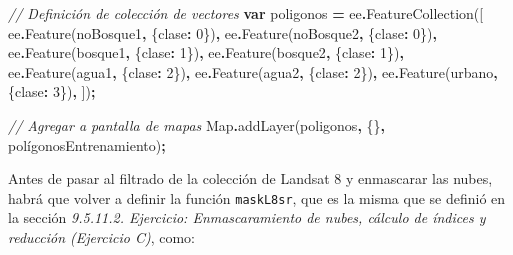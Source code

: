 \documentclass[
  12pt,
  letterpaper,
  twoside]{book}
\newenvironment{Shaded}{\begin{snugshade}}{\end{snugshade}}
\newcommand{\BuiltInTok}[1]{#1}
\newcommand{\CommentTok}[1]{\textcolor[rgb]{0.56,0.35,0.01}{\textit{#1}}}
\newcommand{\DecValTok}[1]{\textcolor[rgb]{0.00,0.00,0.81}{#1}}
\newcommand{\FunctionTok}[1]{\textcolor[rgb]{0.00,0.00,0.00}{#1}}
\newcommand{\KeywordTok}[1]{\textcolor[rgb]{0.13,0.29,0.53}{\textbf{#1}}}
\newcommand{\NormalTok}[1]{#1}
\newcommand{\OperatorTok}[1]{\textcolor[rgb]{0.81,0.36,0.00}{\textbf{#1}}}
\newcommand{\StringTok}[1]{\textcolor[rgb]{0.31,0.60,0.02}{#1}}
\begin{document}
\begin{Shaded}
\begin{Highlighting}[]
\CommentTok{// Definición de colección de vectores}
\KeywordTok{var}\NormalTok{ poligonos }\OperatorTok{=}\NormalTok{ ee}\OperatorTok{.}\FunctionTok{FeatureCollection}\NormalTok{([}
\NormalTok{  ee}\OperatorTok{.}\FunctionTok{Feature}\NormalTok{(noBosque1}\OperatorTok{,}\NormalTok{ \{}\StringTok{\textquotesingle{}clase\textquotesingle{}}\OperatorTok{:} \DecValTok{0}\NormalTok{\})}\OperatorTok{,}
\NormalTok{  ee}\OperatorTok{.}\FunctionTok{Feature}\NormalTok{(noBosque2}\OperatorTok{,}\NormalTok{ \{}\StringTok{\textquotesingle{}clase\textquotesingle{}}\OperatorTok{:} \DecValTok{0}\NormalTok{\})}\OperatorTok{,}
\NormalTok{  ee}\OperatorTok{.}\FunctionTok{Feature}\NormalTok{(bosque1}\OperatorTok{,}\NormalTok{ \{}\StringTok{\textquotesingle{}clase\textquotesingle{}}\OperatorTok{:} \DecValTok{1}\NormalTok{\})}\OperatorTok{,}
\NormalTok{  ee}\OperatorTok{.}\FunctionTok{Feature}\NormalTok{(bosque2}\OperatorTok{,}\NormalTok{ \{}\StringTok{\textquotesingle{}clase\textquotesingle{}}\OperatorTok{:} \DecValTok{1}\NormalTok{\})}\OperatorTok{,}
\NormalTok{  ee}\OperatorTok{.}\FunctionTok{Feature}\NormalTok{(agua1}\OperatorTok{,}\NormalTok{ \{}\StringTok{\textquotesingle{}clase\textquotesingle{}}\OperatorTok{:} \DecValTok{2}\NormalTok{\})}\OperatorTok{,}
\NormalTok{  ee}\OperatorTok{.}\FunctionTok{Feature}\NormalTok{(agua2}\OperatorTok{,}\NormalTok{ \{}\StringTok{\textquotesingle{}clase\textquotesingle{}}\OperatorTok{:} \DecValTok{2}\NormalTok{\})}\OperatorTok{,}
\NormalTok{  ee}\OperatorTok{.}\FunctionTok{Feature}\NormalTok{(urbano}\OperatorTok{,}\NormalTok{ \{}\StringTok{\textquotesingle{}clase\textquotesingle{}}\OperatorTok{:} \DecValTok{3}\NormalTok{\})}\OperatorTok{,}
\NormalTok{])}\OperatorTok{;}

\CommentTok{// Agregar a pantalla de mapas}
\BuiltInTok{Map}\OperatorTok{.}\FunctionTok{addLayer}\NormalTok{(poligonos}\OperatorTok{,}\NormalTok{ \{\}}\OperatorTok{,} \StringTok{\textquotesingle{}polígonosEntrenamiento\textquotesingle{}}\NormalTok{)}\OperatorTok{;}
\end{Highlighting}
\end{Shaded}

Antes de pasar al filtrado de la colección de Landsat 8 y enmascarar las nubes, habrá que volver a definir la función \texttt{maskL8sr}, que es la misma que se definió en la sección \emph{9.5.11.2. Ejercicio: Enmascaramiento de nubes, cálculo de índices y reducción (Ejercicio C)}, como:
\end{document}
